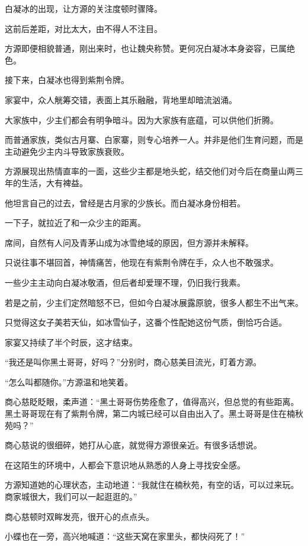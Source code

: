 
\begin{this_body}

白凝冰的出现，让方源的关注度顿时骤降。

这前后差距，对比太大，由不得人不注目。

方源即便相貌普通，刚出来时，也让魏央称赞。更何况白凝冰本身姿容，已属绝色。

接下来，白凝冰也得到紫荆令牌。

家宴中，众人觥筹交错，表面上其乐融融，背地里却暗流汹涌。

大家族中，少主们都会有明争暗斗。因为大家族有底蕴，可以供他们折腾。

而普通家族，类似古月寨、白家寨，则专心培养一人。并非是他们生育问题，而是主动避免少主内斗导致家族衰败。

方源展现出热情直率的一面，这些少主都是地头蛇，结交他们对今后在商量山两三年的生活，大有裨益。

他坦言自己的过去，曾经是古月家的少族长。而白凝冰身份相若。

一下子，就拉近了和一众少主的距离。

席间，自然有人问及青茅山成为冰雪绝域的原因，但方源并未解释。

只说往事不堪回首，神情痛苦，他现在有紫荆令牌在手，众人也不敢强求。

一些少主主动向白凝冰敬酒，但后者却爱理不理，仍旧我行我素。

若是之前，少主们定然暗怒不已，但如今白凝冰展露原貌，很多人都生不出气来。

只觉得这女子美若天仙，如冰雪仙子，这番个性配她这份气质，倒恰巧合适。

家宴又持续了半个时辰，这才结束。

“我还是叫你黑土哥哥，好吗？”分别时，商心慈美目流光，盯着方源。

“怎么叫都随你。”方源温和地笑着。

商心慈眨眨眼，柔声道：“黑土哥哥伤势痊愈了，值得高兴，但总觉的有些距离。黑土哥哥现在有了紫荆令牌，第二内城已经可以自由出入了。黑土哥哥是住在楠秋苑吗？”

商心慈说的很细碎，她打从心底，就觉得方源很亲近。有很多话想说。

在这陌生的环境中，人都会下意识地从熟悉的人身上寻找安全感。

方源知道她的心理状态，主动地道：“我就住在楠秋苑，有空的话，可以过来玩。商家城很大，我们可以一起逛逛的。”

商心慈顿时双眸发亮，很开心的点点头。

小蝶也在一旁，高兴地喊道：“这些天窝在家里头，都快闷死了！”


\end{this_body}

